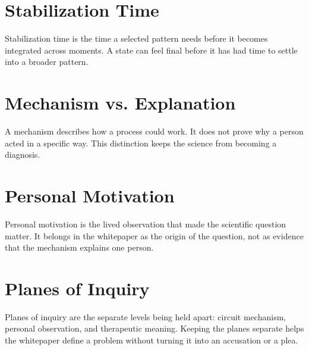 \documentclass[10pt,twocolumn]{article}
\begin{document}
\section{Stabilization Time}
Stabilization time is the time a selected pattern needs before it becomes integrated across moments. A state can feel final before it has had time to settle into a broader pattern.

\section{Mechanism vs. Explanation}
A mechanism describes how a process could work. It does not prove why a person acted in a specific way. This distinction keeps the science from becoming a diagnosis.

\section{Personal Motivation}
Personal motivation is the lived observation that made the scientific question matter. It belongs in the whitepaper as the origin of the question, not as evidence that the mechanism explains one person.

\section{Planes of Inquiry}
Planes of inquiry are the separate levels being held apart: circuit mechanism, personal observation, and therapeutic meaning. Keeping the planes separate helps the whitepaper define a problem without turning it into an accusation or a plea.
\end{document}
